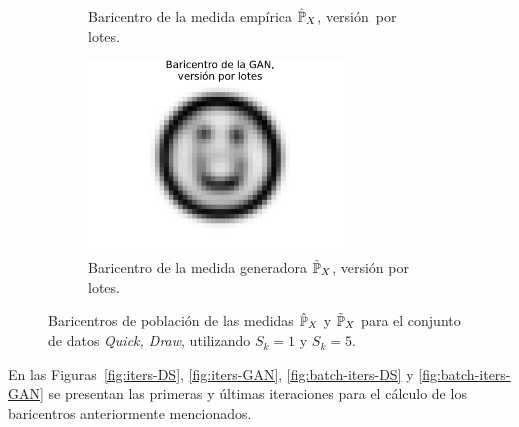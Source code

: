 \begin{figure}[htbp]
\begin{subfigure}[b]{0.45\textwidth}
        \caption{Baricentro de la medida empírica $\hat\Prob_X$, versión~por lotes.}
        \label{fig:batch-bar-DS}
    \end{subfigure}
    \hfill
    \begin{subfigure}[b]{0.45\textwidth}
        \centering
        \includegraphics[width=0.75\textwidth]{img/barycenters/batch-bar-GAN.pdf}
        \caption{Baricentro de la medida generadora $\tilde\Prob_X$, versión por lotes.}
        \label{fig:batch-bar-GAN}
    \end{subfigure}
    \caption{Baricentros de población de las medidas $\hat\Prob_X$ y $\tilde\Prob_X$ para el conjunto de datos \textit{Quick, Draw}, utilizando $S_k=1$ y $S_k=5$.}
    \label{fig:barycenters}
\end{figure}

En las Figuras~\ref{fig:iters-DS}, \ref{fig:iters-GAN}, \ref{fig:batch-iters-DS} y \ref{fig:batch-iters-GAN} se presentan las primeras y últimas iteraciones para el cálculo de los baricentros anteriormente mencionados.


